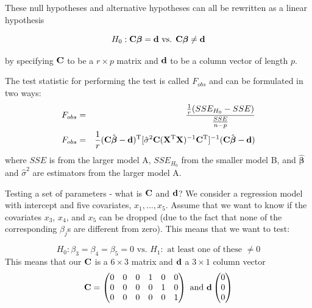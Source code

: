 \documentclass[
  ignorenonframetext,
]{beamer}
\begin{document}
\begin{frame}
These null hypotheses and alternative hypotheses can all be rewritten as
a linear hypothesis

\[
H_0: {\bf C}{\boldsymbol \beta}={\bf d} \text{ vs. } {\bf C}{\boldsymbol \beta}\neq {\bf d}
\]

by specifying \({\bf C}\) to be a \(r \times p\) matrix and \({\bf d}\)
to be a column vector of length \(p\).

The test statistic for performing the test is called \(F_{obs}\) and can
be formulated in two ways: \begin{eqnarray}
F_{obs}&=&\frac{\frac{1}{r} (SSE_{H_0}-SSE)}{\frac{SSE}{n-p}} \label{Fobsnested}\\
F_{obs}&=&\frac{1}{r}({\bf C}\hat{{\boldsymbol \beta}}-{\bf d})^{\text T}[\hat{\sigma}^2 {\bf C}({\bf X}^{\text T}{\bf X})^{-1}{\bf C}^{\text T}]^{-1}({\bf C}\hat{{\boldsymbol \beta}}-{\bf d}) \label{FobsCbeta}
\end{eqnarray} where \(SSE\) is from the larger model A, \(SSE_{H_0}\)
from the smaller model B, and \(\hat{{\boldsymbol \beta}}\) and
\(\hat{\sigma}^2\) are estimators from the larger model A.
\end{frame}

\begin{frame}
\begin{block}{Testing a set of parameters - what is \({\bf C}\) and
\({\bf d}\)?}
\label{testing-a-set-of-parameters---what-is-bf-c-and-bf-d}
We consider a regression model with intercept and five covariates,
\(x_1, \ldots, x_5\). Assume that we want to know if the covariates
\(x_3\), \(x_4\), and \(x_5\) can be dropped (due to the fact that none
of the corresponding \(\beta_j\)s are different from zero). This means
that we want to test:

\[H_0: \beta_{3}=\beta_{4}=\beta_{5}=0 \text{ vs. } H_1:\text{ at least one of these }\neq 0\]
This means that our \({\bf C}\) is a \(6\times 3\) matrix and
\({\bf d}\) a \(3 \times 1\) column vector
\[ {\bf C}=\begin{pmatrix} 0 &0 &0 &1 &0&0 \\
0&0&0&0&1&0\\
0&0&0&0&0& 1\\
\end{pmatrix} \text{ and } 
{\bf d} \begin{pmatrix} 0\\0\\0\\ \end{pmatrix}\]
\end{block}
\end{frame}
\end{document}
